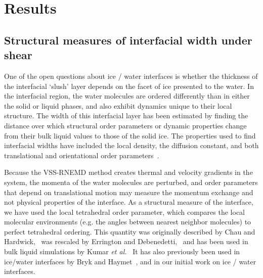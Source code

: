 \documentclass[journal = jpccck, manuscript = article]{achemso}
\begin{document}
\section{Results}

\subsection{Structural measures of interfacial width under shear}
One of the open questions about ice / water interfaces is whether the
thickness of the interfacial `slush' layer depends on the facet
of ice presented to the water. In the interfacial region, the water
molecules are ordered differently than in either the solid or liquid
phases, and also exhibit dynamics unique to their local structure.
The width of this interfacial layer has been estimated by finding the
distance over which structural order parameters or dynamic properties
change from their bulk liquid values to those of the solid ice. The
properties used to find interfacial widths have included the local
density, the diffusion constant, and both translational and
orientational order
parameters~\cite{Karim1988,Karim1990,Hayward2001,Hayward2002,Bryk2002,Gay2002,Louden2013}.

Because the VSS-RNEMD method creates thermal and velocity gradients in
the system, the momenta of the water molecules are perturbed, and
order parameters that depend on translational motion may measure the
momentum exchange and not physical properties of the interface.  As a
structural measure of the interface, we have used the local
tetrahedral order parameter, which compares the local molecular
environments (e.g. the angles between nearest neighbor molecules) to
perfect tetrahedral ordering.  This quantity was originally described
by Chau and Hardwick,~\cite{Chau1998} was rescaled by Errington and
Debenedetti,~\cite{Errington2001} and has been used in bulk liquid 
simulations by Kumar \textit{et al.}~\cite{Kumar2009} It has also
previously been used in ice/water interfaces by Bryk and
Haymet~\cite{Bryk2004}, and in our initial work on ice / water
interfaces\cite{Louden2013}.
\end{document}
